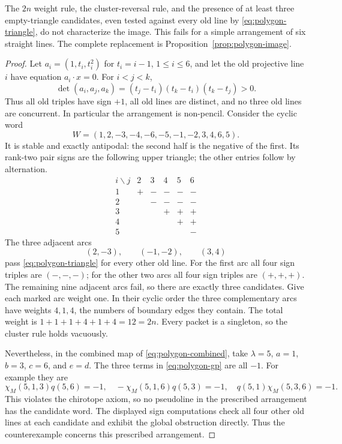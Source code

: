 \begin{proposition}\label{prop:polygon-obstruction}

The $2n$ weight rule, the cluster-reversal rule, and the presence of at
least three empty-triangle candidates, even tested against every old
line by \eqref{eq:polygon-triangle}, do not characterize the image.  This
fails for a simple arrangement of six straight lines.  The complete
replacement is Proposition~\ref{prop:polygon-image}.
\end{proposition}
\begin{proof}

Let $a_i=(1,t_i,t_i^2)$ for $t_i=i-1$, $1\le i\le6$, and let the old
projective line $i$ have equation $a_i\cdot x=0$.  For $i<j<k$,
\[
 \det(a_i,a_j,a_k)=(t_j-t_i)(t_k-t_i)(t_k-t_j)>0.
\]
Thus all old triples have sign $+1$, all old lines are distinct, and
no three old lines are concurrent.  In particular the arrangement is
non-pencil.  Consider the cyclic word
\[
 W=(1,2,-3,-4,-6,-5,-1,-2,3,4,6,5).
\]
It is stable and exactly antipodal: the second half is the negative of
the first. Its rank-two pair signs are the following upper triangle;
the other entries follow by alternation.
\[
\begin{array}{c|rrrrr}
i\backslash j&2&3&4&5&6\\ \hline
1&+&-&-&-&-\\
2&&-&-&-&-\\
3&&&+&+&+\\
4&&&&+&+\\
5&&&&&-
\end{array}
\]
The three adjacent arcs
\[
                (2,-3),\qquad(-1,-2),\qquad(3,4)
\]
pass \eqref{eq:polygon-triangle} for every other old line.  For the first
arc all four sign triples are $(-,-,-)$; for the other two arcs all
four sign triples are $(+,+,+)$.  The remaining nine adjacent arcs
fail, so there are exactly three candidates.  Give each marked arc
weight one.  In their cyclic order the three complementary arcs have
weights $4,1,4$, the numbers of boundary edges they contain.  The
total weight is $1+1+1+4+1+4=12=2n$. Every packet is a singleton,
so the cluster rule holds vacuously.

Nevertheless, in the combined map of \eqref{eq:polygon-combined}, take
$\lambda=5$, $a=1$, $b=3$, $c=6$, and $e=d$.  The three terms in
\eqref{eq:polygon-gp} are all $-1$.  For example they are
\[
 \chi_M(5,1,3)q(5,6)=-1,\quad
 -\chi_M(5,1,6)q(5,3)=-1,\quad
 q(5,1)\chi_M(5,3,6)=-1.
\]
This violates the chirotope axiom, so no pseudoline in the prescribed
arrangement has the candidate word.  The displayed sign computations check all four other old lines
at each candidate and exhibit the global obstruction directly.
Thus the counterexample concerns this prescribed arrangement.
\end{proof}

